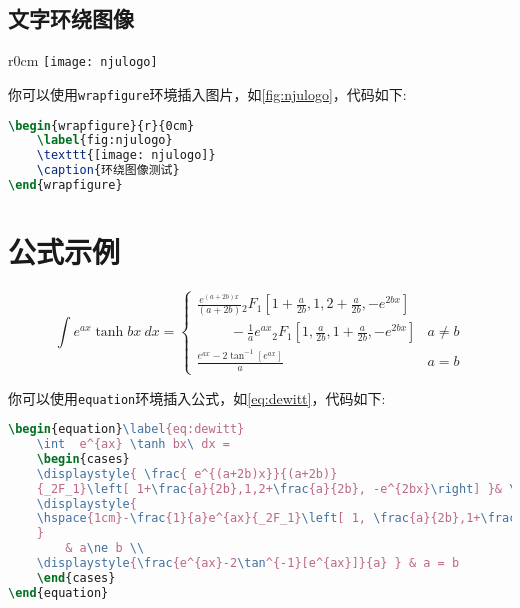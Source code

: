 \documentclass[
    TitleLength=1,%
    Degree=UG,%
    Type=thesis%
]{njuthesis}
\begin{document}
\subsection{文字环绕图像}
\begin{wrapfigure}{r}{0cm}
    \label{fig:njulogo}
    \texttt{[image: njulogo]}
    \caption{环绕图像测试}
\end{wrapfigure}
\zhlipsum[4][name=xiangyu]

你可以使用\lstinline|wrapfigure|环境插入图片，如\cref{fig:njulogo}，代码如下:
\begin{lstlisting}[language=TeX]
    \begin{wrapfigure}{r}{0cm}
    \label{fig:njulogo}
    \texttt{[image: njulogo]}
    \caption{环绕图像测试}
\end{wrapfigure}
\end{lstlisting}

\section{公式示例}
\begin{equation}\label{eq:dewitt}
    \int  e^{ax} \tanh bx\ dx = 
    \begin{cases}
    \displaystyle{ \frac{ e^{(a+2b)x}}{(a+2b)} 
    {_2F_1}\left[ 1+\frac{a}{2b},1,2+\frac{a}{2b}, -e^{2bx}\right] }& \\
    \displaystyle{
    \hspace{1cm}-\frac{1}{a}e^{ax}{_2F_1}\left[ 1, \frac{a}{2b},1+\frac{a}{2b}, -e^{2bx}\right]
    }
     & a\ne b \\
    \displaystyle{\frac{e^{ax}-2\tan^{-1}[e^{ax}]}{a} } & a = b
    \end{cases}
\end{equation}
    
你可以使用\lstinline|equation|环境插入公式，如\cref{eq:dewitt}，代码如下:
\begin{lstlisting}[language=TeX]
\begin{equation}\label{eq:dewitt}
    \int  e^{ax} \tanh bx\ dx = 
    \begin{cases}
    \displaystyle{ \frac{ e^{(a+2b)x}}{(a+2b)} 
    {_2F_1}\left[ 1+\frac{a}{2b},1,2+\frac{a}{2b}, -e^{2bx}\right] }& \\
    \displaystyle{
    \hspace{1cm}-\frac{1}{a}e^{ax}{_2F_1}\left[ 1, \frac{a}{2b},1+\frac{a}{2b}, -e^{2bx}\right]
    }
        & a\ne b \\
    \displaystyle{\frac{e^{ax}-2\tan^{-1}[e^{ax}]}{a} } & a = b
    \end{cases}
\end{equation}
\end{lstlisting}
\end{document}
